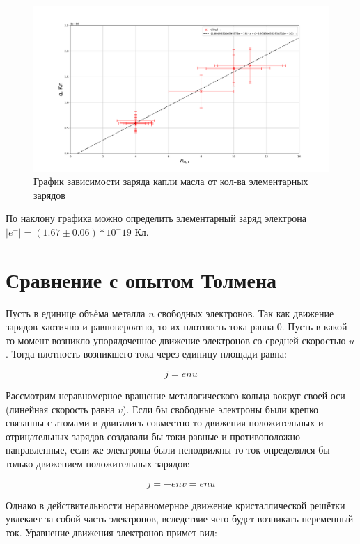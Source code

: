 \documentclass{lab}
\begin{document}
\begin{figure}[H]
    \centering
    \includegraphics[width=\textwidth]{graph.png}
    \caption{График зависимости заряда капли масла от кол-ва элементарных зарядов}
    \label{graph:q_n}
\end{figure}

По наклону графика можно определить элементарный заряд электрона $|e^{-}| = (1.67 \pm 0.06) * 10^-19$ Кл.

\section{Сравнение с опытом Толмена}

Пусть в единице объёма металла $n$ свободных электронов. Так как движение зарядов хаотично и равновероятно, то их плотность тока равна 0. Пусть в какой-то момент возникло упорядоченное движение электронов со средней скоростью $u$. Тогда плотность возникшего тока через единицу площади равна:

\begin{equation}
    j = enu
\end{equation}

Рассмотрим неравномерное вращение металогического кольца вокруг своей оси (линейная скорость равна $v$). Если бы свободные электроны были крепко связанны с атомами и двигались совместно то движения положительных и отрицательных зарядов создавали бы токи равные и противоположно направленные, если же электроны были неподвижны то ток определялся бы только движением положительных зарядов:

\begin{equation}
    j = -env = enu
\end{equation}

Однако в действительности неравномерное движение кристаллической решётки увлекает за собой часть электронов, вследствие чего будет возникать переменный ток.
Уравнение движения электронов примет вид:
\end{document}
